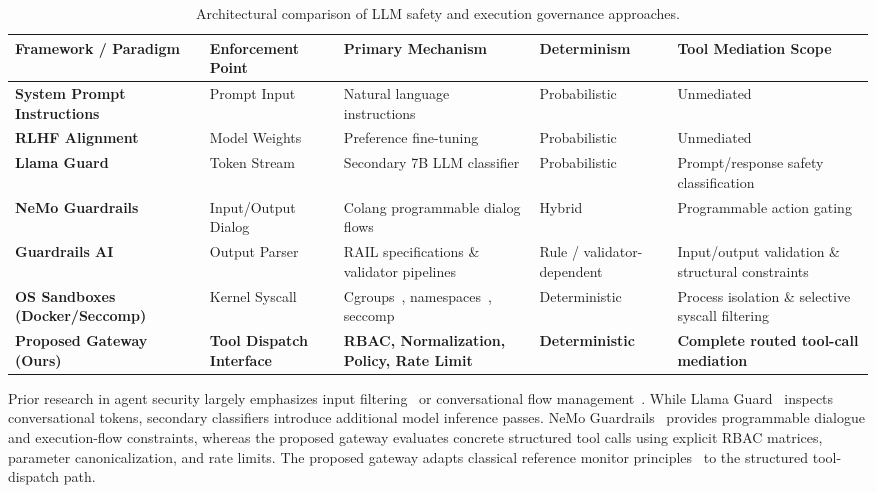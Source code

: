 \documentclass[10pt,twocolumn,letterpaper]{article}
\begin{document}
\begin{table}[t]
\centering
\small
\caption{Architectural comparison of LLM safety and execution governance approaches.}
\label{tab:related_work}
\begin{tabular}{lllll}
\toprule
\textbf{Framework / Paradigm} & \textbf{Enforcement Point} & \textbf{Primary Mechanism} & \textbf{Determinism} & \textbf{Tool Mediation Scope} \\
\midrule
\textbf{System Prompt Instructions}~\cite{perez} & Prompt Input & Natural language instructions & Probabilistic & Unmediated \\
\textbf{RLHF Alignment}~\cite{ouyang} & Model Weights & Preference fine-tuning & Probabilistic & Unmediated \\
\textbf{Llama Guard}~\cite{llamaguard} & Token Stream & Secondary 7B LLM classifier & Probabilistic & Prompt/response safety classification \\
\textbf{NeMo Guardrails}~\cite{nemoguardrails} & Input/Output Dialog & Colang programmable dialog flows & Hybrid & Programmable action gating \\
\textbf{Guardrails AI}~\cite{guardrails} & Output Parser & RAIL specifications \& validator pipelines & Rule / validator-dependent & Input/output validation \& structural constraints \\
\textbf{OS Sandboxes (Docker/Seccomp)}~\cite{merkel,kerrisk_book} & Kernel Syscall & Cgroups~\cite{kerrisk_book,kerrisk_cgroups}, namespaces~\cite{kerrisk_book,kerrisk_namespaces}, seccomp~\cite{kerrisk_seccomp} & Deterministic & Process isolation \& selective syscall filtering \\
\textbf{Proposed Gateway (Ours)} & \textbf{Tool Dispatch Interface} & \textbf{RBAC, Normalization, Policy, Rate Limit} & \textbf{Deterministic} & \textbf{Complete routed tool-call mediation} \\
\bottomrule
\end{tabular}
\end{table}

Prior research in agent security largely emphasizes input filtering~\cite{perez,llamaguard} or conversational flow management~\cite{nemoguardrails}. While Llama Guard~\cite{llamaguard} inspects conversational tokens, secondary classifiers introduce additional model inference passes. NeMo Guardrails~\cite{nemoguardrails} provides programmable dialogue and execution-flow constraints, whereas the proposed gateway evaluates concrete structured tool calls using explicit RBAC matrices, parameter canonicalization, and rate limits. The proposed gateway adapts classical reference monitor principles~\cite{anderson,schneider} to the structured tool-dispatch path.
\end{document}
